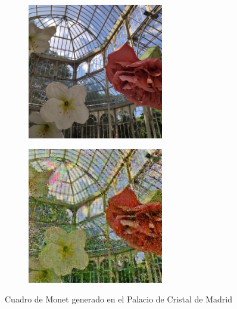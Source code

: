 \documentclass[[../main.tex]{subfiles}
\begin{document}
        \begin{figure}[!htb]
            \begin{subfigure}[b]{0.49\textwidth}
            \includegraphics[width=0.65\textwidth]{imagenes/imagen2cuadro/propias/monet/IMG_20200722_184017_1.jpg}
            \end{subfigure}
        \hfill
            \begin{subfigure}[b]{0.49\textwidth}
            \includegraphics[width=0.65\textwidth]{imagenes/imagen2cuadro/propias/monet/IMG_20200722_184017_1_2.jpg}
            \end{subfigure}
        \caption{Cuadro de Monet generado en el Palacio de Cristal de Madrid}
        \label{fig:monet_cuadro_palacio_cristal}
        \end{figure}
        
\end{document}
